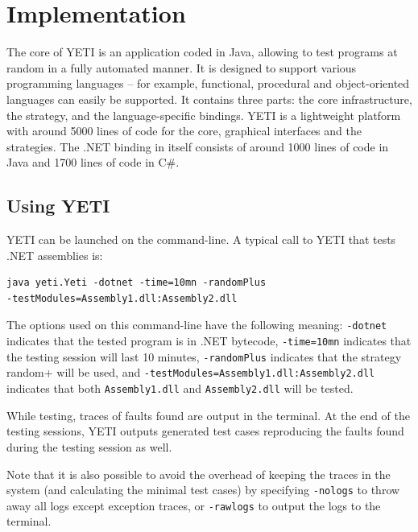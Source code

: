 \section{Implementation}\label{sec:implem}

The core of YETI is an application coded in Java, allowing to test programs at random in a fully automated manner. It is designed to support various programming languages -- for example, functional, procedural and object-oriented languages can easily be supported.
 It contains three parts: the core infrastructure, the strategy, and the language-specific bindings. 
YETI is a lightweight platform with around 5000 lines of code for the core, graphical interfaces and the strategies.
The .NET binding in itself consists of around 1000 lines of code in Java and 1700 lines of code in C\#.

\subsection{Using YETI}
YETI can be launched on the command-line. A typical call to YETI that tests .NET assemblies is:
{\small
\begin{verbatim}
java yeti.Yeti -dotnet -time=10mn -randomPlus
-testModules=Assembly1.dll:Assembly2.dll
\end{verbatim}
}

The options used on this command-line have the following meaning: \texttt{-dotnet} 
indicates that the tested program is in .NET bytecode,
\texttt{-time=10mn} indicates that the testing session will last 10 minutes, 
\texttt{-randomPlus} indicates that the strategy random+ will be used, and  
\texttt{-testModules=Assembly1.dll:Assembly2.dll} indicates that both \texttt{Assembly1.dll} and
\texttt{Assembly2.dll} will be tested.

While testing, traces of faults found are output in the terminal. At the end of the testing sessions, YETI outputs generated test cases reproducing 
the faults found during the testing session as well.


Note that it is also possible to avoid the overhead of keeping the 
traces in the system (and calculating the minimal test cases) by specifying 
\texttt{-nologs} to throw away all logs except exception traces, or 
\texttt{-rawlogs} to output the logs to the terminal.


